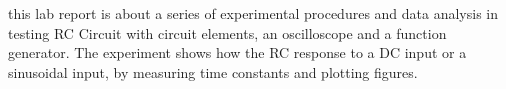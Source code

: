 this lab report is about a series of experimental procedures and data analysis in testing RC Circuit with circuit elements, an oscilloscope and a function generator. The experiment shows how the RC response to a DC input or a sinusoidal input, by measuring time constants and plotting figures.